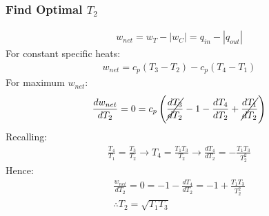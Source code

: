\documentclass[class=report, crop=false, 12pt,a4paper]{standalone}
\numberwithin{equation}{section}
\begin{document}
\subsubsection{Find Optimal $T_2$}
\begin{gather}
  w_{net} = w_T - |w_C| = q_{in} - |q_{out}|
\end{gather}
For constant specific heats:
\begin{gather}
  w_{net} = c_p(T_3-T_2) - c_p(T_4-T_1)
\end{gather}
For maximum $w_{net}$:
\begin{gather}
  \frac{dw_{net}}{dT_2} = 0 = c_p\left(\cancel{\frac{dT_3}{dT_2}}-1-\frac{dT_4}{dT_2}+\cancel{\frac{dT_1}{dT_2}}\right)
\end{gather}
Recalling:
\begin{gather}
  \frac{T_4}{T_1} = \frac{T_3}{T_2} \longrightarrow T_4 = \frac{T_1T_3}{T_2} \longrightarrow \frac{dT_4}{dT_2} = -\frac{T_1T_3}{T_2^2}
\end{gather}
Hence:
\begin{gather}
  \frac{w_{net}}{dT_2} = 0 = -1-\frac{dT_4}{dT_2} = -1+\frac{T_1T_3}{T_2^2} \\[5pt]
  \therefore T_2 = \sqrt{T_1T_3}
\end{gather}
\end{document}
